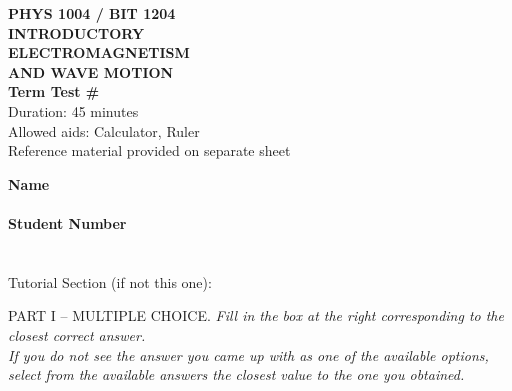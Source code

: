 \clearpage
\begin{minipage}[t]{0.5\textwidth}
\textbf{PHYS 1004 / BIT 1204 \\
INTRODUCTORY \\ 
ELECTROMAGNETISM \\
AND WAVE MOTION} \\
\textbf{Term Test \# \testNumber}  \\ %
Duration: 45 minutes \\
Allowed aids: Calculator, Ruler \\
Reference material provided on separate sheet \\
\vspace{0.2cm}
\end{minipage}
\begin{minipage}[t]{0.5\textwidth}
\textbf{Name}\hrulefill \\
\\
\textbf{Student Number}\hrulefill \\
\\
%
%
\small
\currentTutorial \\
Tutorial Section (if not this one): \hrulefill \\
\end{minipage}

PART I -- MULTIPLE CHOICE. 
\textit{Fill in the box at the right corresponding to the closest correct answer.  \\ If you do not see the answer you came up with as one of the available options, select from the available answers the closest value to the one you obtained.}
